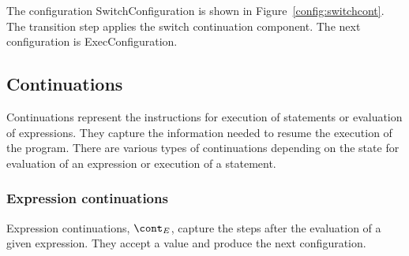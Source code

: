 \documentclass{article}
\begin{document}
The configuration SwitchConfiguration is shown in Figure~\ref{config:switchcont}.
The transition step applies the switch continuation component.
The next configuration is ExecConfiguration.

\subsection{Continuations}
\label{subsec:continuations-definition}

\newcommand{\expressionmeta}{\ensuremath{\mathit{E}}}
\newcommand{\expressionsmeta}{\expressionmeta{s}}
\newcommand{\variablemeta}{\ensuremath{\mathit{X}}}
\newcommand{\boolmeta}{\ensuremath{\mathit{B}}}
\newcommand{\integermeta}{\ensuremath{\mathit{I}}}
\newcommand{\doublemeta}{\ensuremath{\mathit{D}}}
\newcommand{\stringmeta}{\ensuremath{\mathit{S}}}
\newcommand{\idmeta}{\ensuremath{\mathit{X}}}
\newcommand{\membermeta}{\ensuremath{\mathit{M}}}
\newcommand{\typemeta}{\ensuremath{\mathit{T}}}
\newcommand{\statementmeta}{\ensuremath{\mathit{\stmt}}}
\newcommand{\labelmeta}{\ensuremath{\mathit{\tt{L}}}}

Continuations represent the instructions for execution of statements or evaluation of expressions.
They capture the information needed to resume the execution of the program.
There are various types of continuations depending on the state for evaluation of an expression or execution of a statement.
\subsubsection{Expression continuations}
\label{subsubsec:expression-continuations}

Expression continuations, $\econt$, capture the steps after the evaluation of a given expression.
They accept a value and produce the next configuration.
\end{document}
